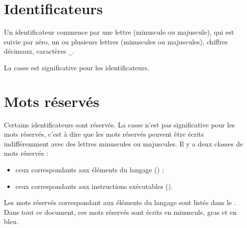 \section{Identificateurs}
Un identificateur commence par une lettre (minuscule ou majuscule), qui est suivie par zéro, un ou plusieurs lettres (minuscules ou majuscules), chiffres décimaux, caractères \texttt{\_}.

La casse est significative pour les identificateurs.

\section{Mots réservés}

Certains identificateurs sont réservés. La casse n’est pas significative pour les mots réservés, c’est à dire que les mots réservés peuvent être écrits indifféremment avec des lettres minuscules ou majuscules. Il y a deux classes de mots réservés :
\begin{itemize}
  \item ceux correspondants aux éléments du langage () ;
  \item ceux correspondants aux instructions exécutables ().
\end{itemize}


Les mots réservés correspondant aux éléments du langage sont listés dans le . Dans tout ce document, ces mots réservés sont écrits en minuscule, gras et en bleu.


\newcommand\keyWordLanguage[1]{\textcolor{blue}{\bf#1}}

